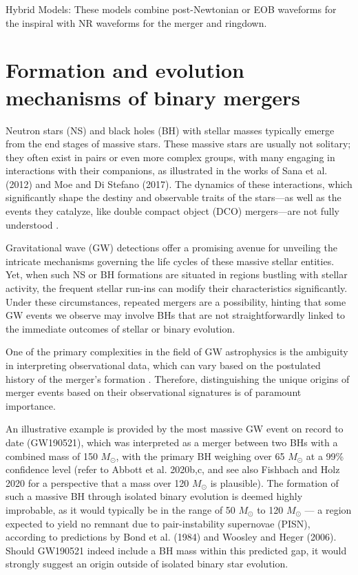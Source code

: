 Hybrid Models: These models combine post-Newtonian or EOB waveforms for the inspiral with NR waveforms for the merger and ringdown.


\section{Formation and evolution mechanisms of binary mergers}

Neutron stars (NS) and black holes (BH) with stellar masses typically emerge from the end stages of massive stars. These massive stars are usually not solitary; they often exist in pairs or even more complex groups, with many engaging in interactions with their companions, as illustrated in the works of Sana et al. (2012) and Moe and Di Stefano (2017). The dynamics of these interactions, which significantly shape the destiny and observable traits of the stars—as well as the events they catalyze, like double compact object (DCO) mergers—are not fully understood .

Gravitational wave (GW) detections offer a promising avenue for unveiling the intricate mechanisms governing the life cycles of these massive stellar entities. Yet, when such NS or BH formations are situated in regions bustling with stellar activity, the frequent stellar run-ins can modify their characteristics significantly. Under these circumstances, repeated mergers are a possibility, hinting that some GW events we observe may involve BHs that are not straightforwardly linked to the immediate outcomes of stellar or binary evolution.

One of the primary complexities in the field of GW astrophysics is the ambiguity in interpreting observational data, which can vary based on the postulated history of the merger's formation . Therefore, distinguishing the unique origins of merger events based on their observational signatures is of paramount importance.

An illustrative example is provided by the most massive GW event on record to date (GW190521), which was interpreted as a merger between two BHs with a combined mass of 150 $M_{\odot}$, with the primary BH weighing over 65 $M_{\odot}$ at a 99\% confidence level (refer to Abbott et al. 2020b,c, and see also Fishbach and Holz 2020 for a perspective that a mass over 120 $M_{\odot}$ is plausible). The formation of such a massive BH through isolated binary evolution is deemed highly improbable, as it would typically be in the range of 50 $M_{\odot}$ to 120 $M_{\odot}$ — a region expected to yield no remnant due to pair-instability supernovae (PISN), according to predictions by Bond et al. (1984) and Woosley and Heger (2006). Should GW190521 indeed include a BH mass within this predicted gap, it would strongly suggest an origin outside of isolated binary star evolution.

